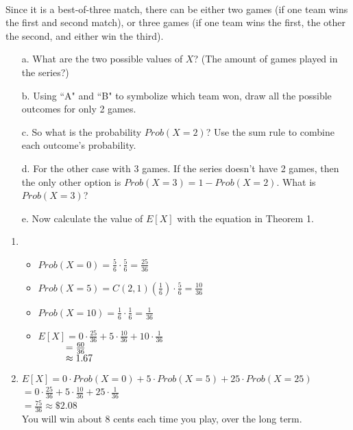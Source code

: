 {\begin{questionNOGRADE}{\thequestion}
        ~\\
        Since it is a best-of-three match, there can be either
        two games (if one team wins the first and second match),
        or three games (if one team wins the first, the other the second, and either win the third).

        \begin{itemize}
            \item[a.]   What are the two possible values of $X$? (The amount of games played in the series?)
            \item[b.]   Using ``A" and ``B" to symbolize which team won, draw all the possible outcomes for only 2 games.
            \item[c.]   So what is the probability $Prob(X = 2)$? Use the sum rule to combine each outcome's probability.
            \item[d.]   For the other case with 3 games. If the series doesn't have 2 games, then the only other option is $Prob(X = 3) = 1 - Prob(X=2)$. What is $Prob(X=3)$?
            \item[e.]   Now calculate the value of $E[X]$ with the equation in Theorem 1.
        \end{itemize}
    \end{questionNOGRADE}


}{

    \begin{enumerate}
        \item
            \begin{itemize}
                \item   $Prob(X = 0) = \frac{5}{6} \cdot \frac{5}{6} = \frac{25}{36}$
                \item   $Prob(X = 5) = C(2,1)(\frac{1}{6}) \cdot \frac{5}{6} = \frac{10}{36}$
                \item   $Prob(X = 10) = \frac{1}{6} \cdot \frac{1}{6} = \frac{1}{36}$
                \item   $E[X] = 0 \cdot \frac{25}{36} + 5 \cdot \frac{10}{36} + 10 \cdot \frac{1}{36}$ \\
                        $ \hspace*{1cm} = \frac{60}{36} $ \\
                        $ \hspace*{1cm} \approx 1.67 $
            \end{itemize}

        \item   $E[X] = 0 \cdot Prob(X = 0) + 5 \cdot Prob(X = 5) + 25 \cdot Prob(X = 25)$
                ~\\
                $= 0 \cdot \frac{25}{36} + 5 \cdot \frac{10}{36} + 25 \cdot \frac{1}{36}$
                ~\\
                $= \frac{75}{36} \approx \$2.08${}
                ~\\
                You will win about 8 cents each time you play, over the long term.


\end{enumerate}}
